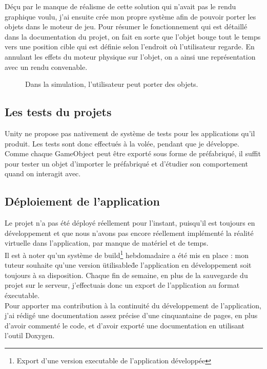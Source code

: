 \documentclass[a4paper]{article}
\begin{document}
    Déçu par le manque de réalisme de cette solution qui n'avait pas le rendu graphique voulu, j'ai ensuite crée mon propre système afin de pouvoir porter les objets dans le moteur de jeu. Pour résumer le fonctionnement qui est détaillé dans la documentation du projet, on fait en sorte que l'objet bouge tout le temps vers une position cible qui est définie selon l'endroit où l'utilisateur regarde. En annulant les effets du moteur physique sur l'objet, on a ainsi une représentation avec un rendu convenable.

    \begin{figure}[H]
        \caption{Dans la simulation, l'utilisateur peut porter des objets.}
    \end{figure}

    \subsection{Les tests du projets}

    Unity ne propose pas nativement de système de tests pour les applications qu'il produit. Les tests sont donc effectués à la volée, pendant que je développe. Comme chaque GameObject peut être exporté sous forme de préfabriqué, il suffit pour tester un objet d'importer le préfabriqué et d'étudier son comportement quand on interagit avec.

    \subsection{Déploiement de l'application}
   
    Le projet n'a pas été déployé réellement pour l'instant, puisqu'il est toujours en développement et que nous n'avons pas encore réellement implémenté la réalité virtuelle dans l'application, par manque de matériel et de temps. \\

    Il est à noter qu'un système de build\footnote{Export d'une version executable de l'application développée} hebdomadaire a été mis en place : mon tuteur souhaite qu'une version \"utilisable\" de l'application en développement soit toujours à sa disposition. Chaque fin de semaine, en plus de la sauvegarde du projet sur le serveur, j'effectuais donc un export de l'application au format éxecutable. \\
    
    Pour apporter ma contribution à la continuité du développement de l'application, j'ai rédigé une documentation assez précise d'une cinquantaine de pages, en plus d'avoir commenté le code, et d'avoir exporté une documentation en utilisant l'outil Doxygen. \\
\end{document}
